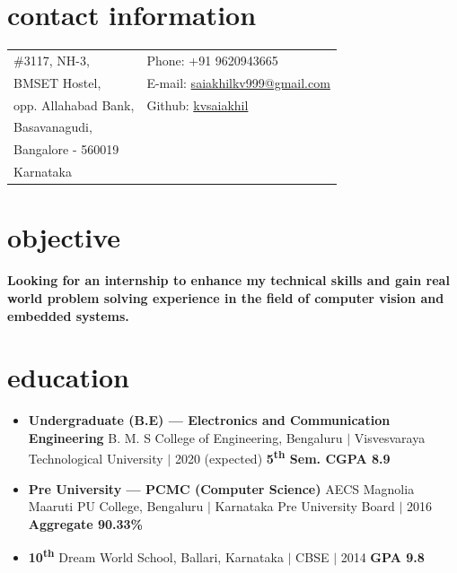 \documentclass[margin,line]{res}
\begin{document}
	\begin{resume}


		\section{\sc contact information}
			\begin{tabular}{@{}p{3.5in}p{3.5in}}
				\#3117, NH-3,          & Phone:  +91 9620943665 \\
				BMSET Hostel,        & E-mail: \href{saiakhilkv999@gmail.com}{saiakhilkv999@gmail.com} \\
				opp. Allahabad Bank, & Github: \href{https://github.com/kvsaiakhil}{kvsaiakhil}\\
				Basavanagudi, & \\
				Bangalore - 560019 \\
				Karnataka\\
			\end{tabular}

		\section{\sc objective}
			\textbf{Looking for an internship to enhance my technical skills and gain real world problem solving experience in the field of computer vision and embedded systems.}

		\section{\sc  education}
			\begin{itemize}
				\item \textbf{Undergraduate (B.E) --- Electronics and Communication Engineering} \newline
					\small B. M. S College of Engineering, Bengaluru $\vert$ Visvesvaraya Technological University $\vert$ 2020 (expected) \newline
					\null\hfill \textbf{5\textsuperscript{th} Sem. CGPA 8.9}

				\item \textbf{Pre University --- PCMC (Computer Science)} \newline
					\small AECS Magnolia Maaruti PU College, Bengaluru $\vert$ Karnataka Pre University Board $\vert$ 2016 \newline
					\null\hfill \textbf{Aggregate 90.33\%}

				\item \textbf{10\textsuperscript{th}} \newline
					\small Dream World School, Ballari, Karnataka $\vert$ CBSE $\vert$ 2014 \newline
					\null\hfill \textbf{GPA 9.8}
			\end{itemize}



\end{resume}
\end{document}

